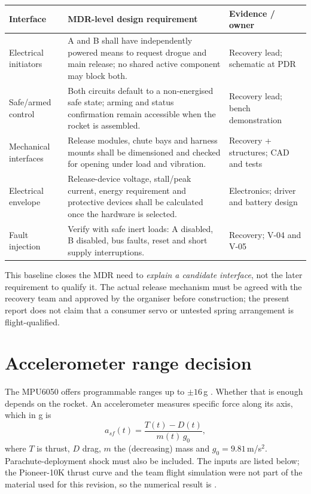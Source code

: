 \small
{}
\begin{tabularx}{\linewidth}{@{}L{34mm}Y L{44mm}@{}}
\toprule{}\textbf{Interface}&\textbf{MDR-level design requirement}&\textbf{Evidence / owner}\\\midrule
Electrical initiators & A and B shall have independently powered means to request drogue and main release; no shared active component may block both. & Recovery lead; schematic at PDR\\
Safe/armed control & Both circuits default to a non-energised safe state; arming and status confirmation remain accessible when the rocket is assembled. & Recovery lead; bench demonstration\\
Mechanical interfaces & Release modules, chute bays and harness mounts shall be dimensioned and checked for opening under load and vibration. & Recovery + structures; CAD and tests\\
Electrical envelope & Release-device voltage, stall/peak current, energy requirement and protective devices shall be calculated once the hardware is selected. & Electronics; driver and battery design\\
Fault injection & Verify with safe inert loads: A disabled, B disabled, bus faults, reset and short supply interruptions. & Recovery; V-04 and V-05\\
\bottomrule
\end{tabularx}
\normalsize

This baseline closes the MDR need to \emph{explain a candidate interface}, not the later requirement to qualify it. The actual release mechanism must be agreed with the recovery team and approved by the organiser before construction; the present report does not claim that a consumer servo or untested spring arrangement is flight-qualified.

\section{Accelerometer range decision}
\label{sec:accel}
The MPU6050 offers programmable ranges up to $\pm16$\,g \cite{mpu6050ds}. Whether that is enough depends on the rocket. An accelerometer measures specific force along its axis, which in g is
\begin{equation}
a_{sf}(t)=\frac{T(t)-D(t)}{m(t)\,g_0},
\end{equation}
where $T$ is thrust, $D$ drag, $m$ the (decreasing) mass and $g_0=9.81$\,m/s$^2$. Parachute-deployment shock must also be included. The inputs are listed below; the Pioneer-10K thrust curve and the team flight simulation were not part of the material used for this revision, so the numerical result is .

